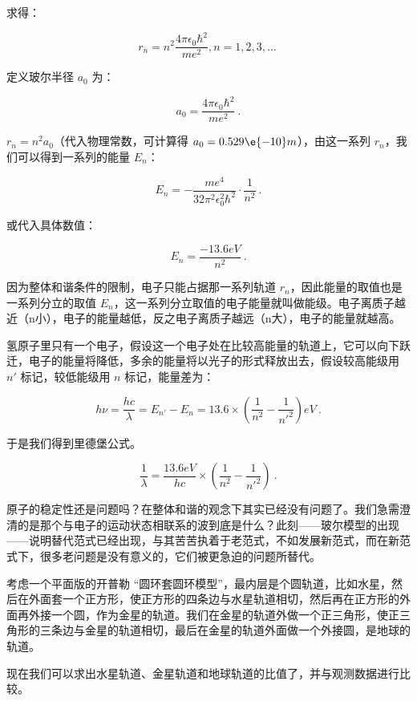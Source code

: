 求得：

\begin{equation}
r_n = n^2 \frac{4 \pi \epsilon_0 \hbar^2  }{ m e^2}, n = 1, 2, 3, ...~
\end{equation}

定义玻尔半径 $a_0$ 为：

\begin{equation}
a_0 = \frac{4 \pi \epsilon_0 \hbar^2  }{ m e^2}~.
\end{equation}

$r_n = n^2 a_0$（代入物理常数，可计算得 $a_0 = 0.529\e{-10} m$），由这一系列 $r_n$，我们可以得到一系列的能量 $E_n$：

\begin{equation}
E_n = - \frac{m e^4 }{ 32 \pi^2 \epsilon_0^2 \hbar^2 } \cdot {\frac{1}{n^2}}~.
\end{equation}

或代入具体数值：

\begin{equation}
E_n = \frac{-13.6 eV}{n^2}~.
\end{equation}

因为整体和谐条件的限制，电子只能占据那一系列轨道 $r_n$，因此能量的取值也是一系列分立的取值 $E_n$，这一系列分立取值的电子能量就叫做能级。电子离质子越近（n小），电子的能量越低，反之电子离质子越远（n大），电子的能量就越高。

氢原子里只有一个电子，假设这一个电子处在比较高能量的轨道上，它可以向下跃迁，电子的能量将降低，多余的能量将以光子的形式释放出去，假设较高能级用 $n'$ 标记，较低能级用 $n$ 标记，能量差为：

\begin{equation}
h \nu = \frac{hc}{\lambda} = E_{n'} - E_n = 13.6 \times \left( \frac{1}{n^2}  - \frac{1}{n'^2} \right) eV ~.
\end{equation}

于是我们得到里德堡公式。

\begin{equation}
\frac{1}{\lambda } = \frac{13.6 eV}{hc} \times \left( \frac{1}{n^2}  - \frac{1}{n'^2} \right)~.
\end{equation}

原子的稳定性还是问题吗？在整体和谐的观念下其实已经没有问题了。我们急需澄清的是那个与电子的运动状态相联系的波到底是什么？此刻——玻尔模型的出现——说明替代范式已经出现，与其苦苦执着于老范式，不如发展新范式，而在新范式下，很多老问题是没有意义的，它们被更急迫的问题所替代。

\begin{exercise}{}
考虑一个平面版的开普勒 “圆环套圆环模型”，最内层是个圆轨道，比如水星，然后在外面套一个正方形，使正方形的四条边与水星轨道相切，然后再在正方形的外面再外接一个圆，作为金星的轨道。我们在金星的轨道外做一个正三角形，使正三角形的三条边与金星的轨道相切，最后在金星的轨道外面做一个外接圆，是地球的轨道。

现在我们可以求出水星轨道、金星轨道和地球轨道的比值了，并与观测数据进行比较。
\end{exercise}


